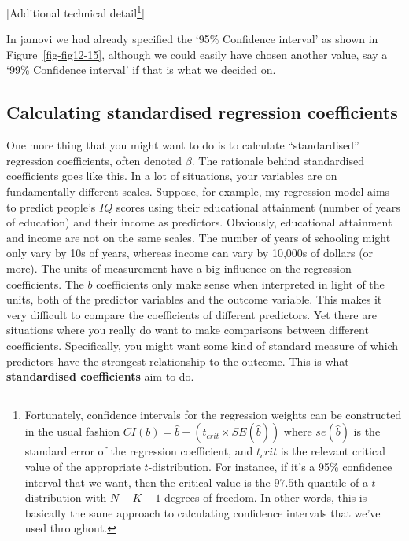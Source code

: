 \documentclass[
  a4paper,
]{book}
\begin{document}
{[}Additional technical detail\footnote{Fortunately, confidence
  intervals for the regression weights can be constructed in the usual
  fashion \(CI(b)=\hat{b} \pm (t_{crit} \times SE(\hat{b}))\) where
  \(se(\hat{b})\) is the standard error of the regression coefficient,
  and \(t_crit\) is the relevant critical value of the appropriate
  \(t\)-distribution. For instance, if it's a 95\% confidence interval
  that we want, then the critical value is the \(97.5\)th quantile of a
  \(t\)-distribution with \(N -K -1\) degrees of freedom. In other
  words, this is basically the same approach to calculating confidence
  intervals that we've used throughout.}{]}

In jamovi we had already specified the `95\% Confidence interval' as
shown in Figure~\ref{fig-fig12-15}, although we could easily have chosen
another value, say a `99\% Confidence interval' if that is what we
decided on.

\hypertarget{calculating-standardised-regression-coefficients}{%
\subsection{Calculating standardised regression
coefficients}\label{calculating-standardised-regression-coefficients}}

One more thing that you might want to do is to calculate
``standardised'' regression coefficients, often denoted \(\beta\). The
rationale behind standardised coefficients goes like this. In a lot of
situations, your variables are on fundamentally different scales.
Suppose, for example, my regression model aims to predict people's
\(IQ\) scores using their educational attainment (number of years of
education) and their income as predictors. Obviously, educational
attainment and income are not on the same scales. The number of years of
schooling might only vary by 10s of years, whereas income can vary by
10,000s of dollars (or more). The units of measurement have a big
influence on the regression coefficients. The \(b\) coefficients only
make sense when interpreted in light of the units, both of the predictor
variables and the outcome variable. This makes it very difficult to
compare the coefficients of different predictors. Yet there are
situations where you really do want to make comparisons between
different coefficients. Specifically, you might want some kind of
standard measure of which predictors have the strongest relationship to
the outcome. This is what \textbf{standardised coefficients} aim to do.
\end{document}
